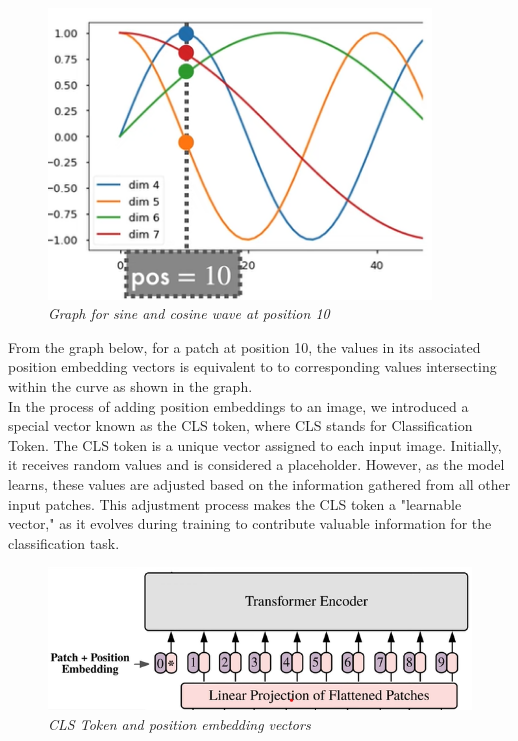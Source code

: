 \begin{figure}[htbp]
    \centering
    \includegraphics[width=4in]{img/pos 10.png}
    \caption{\textit{Graph for sine and cosine wave  at position 10}}
\end{figure}
From the graph below, for a patch at position 10, the values in its associated position embedding vectors is equivalent to to corresponding values intersecting within the curve as shown in the graph.\\
\newpage
In the process of adding position embeddings to an image, we introduced a special vector known as the CLS token, where CLS stands for Classification Token. The CLS token is a unique vector assigned to each input image. Initially, it receives random values and is considered a placeholder. However, as the model learns, these values are adjusted based on the information gathered from all other input patches. This adjustment process makes the CLS token a "learnable vector," as it evolves during training to contribute valuable information for the classification task.\\

\begin{figure}[htbp]
    \centering
    \includegraphics[width=5in]{img/CLS token.png}
    \caption{\textit{CLS Token and position embedding vectors}}
\end{figure}

